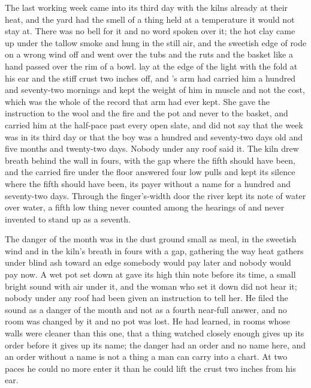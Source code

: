 
The last working week came into its third day with the kilns already at their heat, and the yard had the smell of a thing held at a temperature it would not stay at. There was no bell for it and no word spoken over it; the hot clay came up under the tallow smoke and hung in the still air, and the sweetish edge of  rode on a wrong wind off  and went over the tubs and the ruts and the basket like a hand passed over the rim of a bowl.  lay at the edge of the light with the fold at his ear and the stiff crust two inches off, and 's arm had carried him a hundred and seventy-two mornings and kept the weight of him in muscle and not the cost, which was the whole of the record that arm had ever kept. She gave the instruction to the wool and the fire and the pot and never to the basket, and carried him at the half-pace past every open slate, and did not say that the week was in its third day or that the boy was a hundred and seventy-two days old and five months and twenty-two days. Nobody under any roof said it. The kiln drew breath behind the wall in fours, with the gap where the fifth should have been, and the carried fire under the floor answered four low pulls and kept its silence where the fifth should have been, its payer without a name for a hundred and seventy-two days. Through the finger's-width door the river kept its note of water over water, a fifth low thing never counted among the hearings of  and never invented to stand up as a seventh.

The danger of the month was in the dust ground small as meal, in the sweetish wind and in the kiln's breath in fours with a gap, gathering the way heat gathers under blind ash toward an edge somebody would pay later and nobody would pay now. A wet pot set down at  gave its high thin note before its time, a small bright sound with air under it, and the woman who set it down did not hear it; nobody under any roof had been given an instruction to tell her. He filed the sound as a danger of the month and not as a fourth near-full answer, and no room was changed by it and no pot was lost. He had learned, in rooms whose walls were cleaner than this one, that a thing watched closely enough gives up its order before it gives up its name; the danger had an order and no name here, and an order without a name is not a thing a man can carry into a chart. At two paces he could no more enter it than he could lift the crust two inches from his ear.

